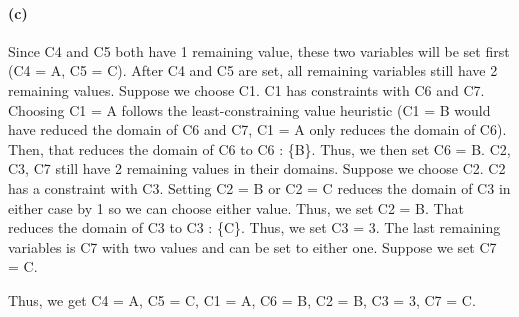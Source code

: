 \documentclass[11pt,a4paper]{article}
\begin{document}
\paragraph*{(c)}

Since C4 and C5 both have 1 remaining value, these two variables will be set first (C4 = A, C5 = C). After C4 and C5 are set, all remaining variables still have 2 remaining values. Suppose we choose C1. C1 has constraints with C6 and C7. Choosing C1 = A follows the least-constraining value heuristic (C1 = B would have reduced the domain of C6 and C7, C1 = A only reduces the domain of C6). Then, that reduces the domain of C6 to C6 : \{B\}. Thus, we then set C6 = B. C2, C3, C7 still have 2 remaining values in their domains. Suppose we choose C2. C2 has a constraint with C3. Setting C2 = B or C2 = C reduces the domain of C3 in either case by 1 so we can choose either value. Thus, we set C2 = B. That reduces the domain of C3 to C3 : \{C\}. Thus, we set C3 = 3. The last remaining variables is C7 with two values and can be set to either one. Suppose we set C7 = C.

Thus, we get C4 = A, C5 = C, C1 = A, C6 = B, C2 = B, C3 = 3, C7 = C. 
 
\end{document}
